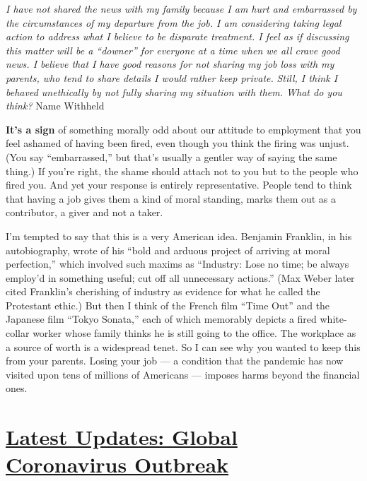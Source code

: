 \emph{I have not shared the news with my family because I am hurt and
embarrassed by the circumstances of my departure from the job. I am
considering taking legal action to address what I believe to be
disparate treatment. I feel as if discussing this matter will be a
``downer'' for everyone at a time when we all crave good news. I believe
that I have good reasons for not sharing my job loss with my parents,
who tend to share details I would rather keep private.} \emph{Still, I
think I behaved unethically by not fully sharing my situation with them.
What do you think?} Name Withheld

\textbf{It's a sign} of something morally odd about our attitude to
employment that you feel ashamed of having been fired, even though you
think the firing was unjust. (You say ``embarrassed,'' but that's
usually a gentler way of saying the same thing.) If you're right, the
shame should attach not to you but to the people who fired you. And yet
your response is entirely representative. People tend to think that
having a job gives them a kind of moral standing, marks them out as a
contributor, a giver and not a taker.

I'm tempted to say that this is a very American idea. Benjamin Franklin,
in his autobiography, wrote of his ``bold and arduous project of
arriving at moral perfection,'' which involved such maxims as
``Industry: Lose no time; be always employ'd in something useful; cut
off all unnecessary actions.'' (Max Weber later cited Franklin's
cherishing of industry as evidence for what he called the Protestant
ethic.) But then I think of the French film ``Time Out'' and the
Japanese film ``Tokyo Sonata,'' each of which memorably depicts a fired
white-collar worker whose family thinks he is still going to the office.
The workplace as a source of worth is a widespread tenet. So I can see
why you wanted to keep this from your parents. Losing your job --- a
condition that the pandemic has now visited upon tens of millions of
Americans --- imposes harms beyond the financial ones.

\hypertarget{latest-updates-global-coronavirus-outbreak}{%
\section{\texorpdfstring{\href{https://www.nytimes.com/2020/08/04/world/coronavirus-cases.html?action=click\&pgtype=Article\&state=default\&region=MAIN_CONTENT_1\&context=storylines_live_updates}{Latest
Updates: Global Coronavirus
Outbreak}}{Latest Updates: Global Coronavirus Outbreak}}\label{latest-updates-global-coronavirus-outbreak}}

